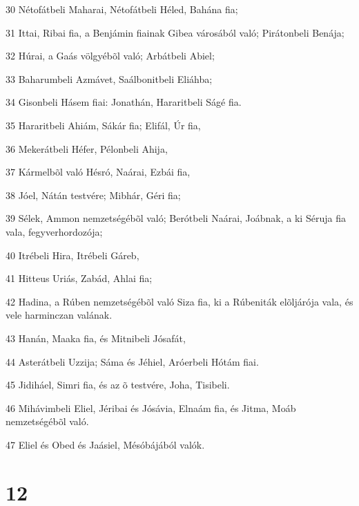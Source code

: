 \par 30 Nétofátbeli Maharai, Nétofátbeli Héled, Bahána fia;
\par 31 Ittai, Ribai fia, a Benjámin fiainak Gibea városából való; Pirátonbeli Benája;
\par 32 Húrai, a Gaás völgyébõl való; Arbátbeli Abiel;
\par 33 Baharumbeli Azmávet, Saálbonitbeli Eliáhba;
\par 34 Gisonbeli Hásem fiai: Jonathán, Hararitbeli Ságé fia.
\par 35 Hararitbeli Ahiám, Sákár fia; Elifál, Úr fia,
\par 36 Mekerátbeli Héfer, Pélonbeli Ahija,
\par 37 Kármelbõl való Hésró, Naárai, Ezbái fia,
\par 38 Jóel, Nátán testvére; Mibhár, Géri fia;
\par 39 Sélek, Ammon nemzetségébõl való; Berótbeli Naárai, Joábnak, a ki Séruja fia vala, fegyverhordozója;
\par 40 Itrébeli Hira, Itrébeli Gáreb,
\par 41 Hitteus Uriás, Zabád, Ahlai fia;
\par 42 Hadina, a Rúben nemzetségébõl való Siza fia, ki a Rúbeniták elõljárója vala, és vele harminczan valának.
\par 43 Hanán, Maaka fia, és Mitnibeli Jósafát,
\par 44 Asterátbeli Uzzija; Sáma és Jéhiel, Aróerbeli Hótám fiai.
\par 45 Jidiháel, Simri fia, és az õ testvére, Joha, Tisibeli.
\par 46 Mihávimbeli Eliel, Jéribai és Jósávia, Elnaám fia, és Jitma, Moáb nemzetségébõl való.
\par 47 Eliel és Obed és Jaásiel, Mésóbájából valók.

\chapter{12}

